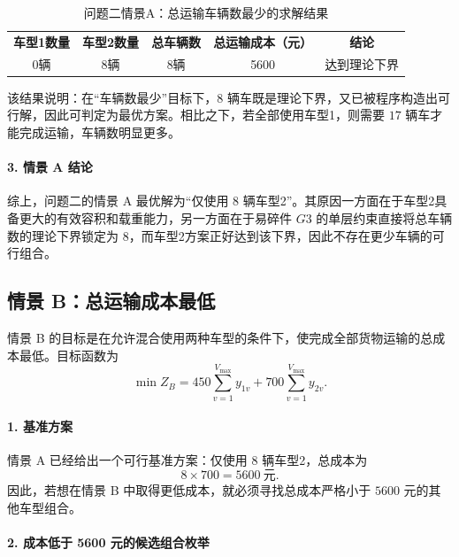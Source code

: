 \documentclass{MMCStyle}
\begin{document}
\begin{table}[H]
\centering
\caption{问题二情景A：总运输车辆数最少的求解结果}
\label{tab:problem2_sceneA_result}
\renewcommand{\arraystretch}{1.22}
\setlength{\tabcolsep}{10pt}
\small
\begin{tabular}{ccccc}
\rowcolor{ReportTeal}
\color{white}\textbf{车型1数量} &
\color{white}\textbf{车型2数量} &
\color{white}\textbf{总车辆数} &
\color{white}\textbf{总运输成本（元）} &
\color{white}\textbf{结论} \\
\rowcolor{ReportStripe}
0辆 & 8辆 & 8辆 & 5600 & 达到理论下界 \\
\end{tabular}
\end{table}


该结果说明：在“车辆数最少”目标下，$8$ 辆车既是理论下界，又已被程序构造出可行解，因此可判定为最优方案。相比之下，若全部使用车型1，则需要 $17$ 辆车才能完成运输，车辆数明显更多。

\paragraph{3. 情景 A 结论}
综上，问题二的情景 A 最优解为“仅使用 $8$ 辆车型2”。其原因一方面在于车型2具备更大的有效容积和载重能力，另一方面在于易碎件 $G3$ 的单层约束直接将总车辆数的理论下界锁定为 $8$，而车型2方案正好达到该下界，因此不存在更少车辆的可行组合。

\subsection{情景 B：总运输成本最低}

情景 B 的目标是在允许混合使用两种车型的条件下，使完成全部货物运输的总成本最低。目标函数为
\begin{equation}
\min Z_B=450\sum_{v=1}^{V_{\max}}y_{1v}+700\sum_{v=1}^{V_{\max}}y_{2v}.
\end{equation}

\paragraph{1. 基准方案}
情景 A 已经给出一个可行基准方案：仅使用 $8$ 辆车型2，总成本为
\begin{equation}
8\times 700=5600\ \mathrm{元}.
\end{equation}
因此，若想在情景 B 中取得更低成本，就必须寻找总成本严格小于 $5600$ 元的其他车型组合。

\paragraph{2. 成本低于 5600 元的候选组合枚举}
\end{document}
